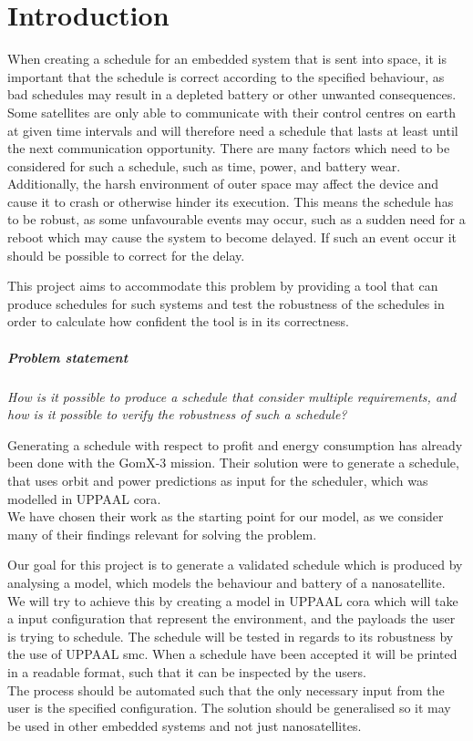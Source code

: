 \chapter{Introduction} \label{cha:intro}
When creating a schedule for an embedded system that is sent into space, it is important that the schedule is correct according to the specified behaviour, as bad schedules may result in a depleted battery or other unwanted consequences. 
Some satellites are only able to communicate with their control centres on earth at given time intervals and will therefore need a schedule that lasts at least until the next communication opportunity.
There are many factors which need to be considered for such a schedule, such as time, power, and battery wear. 
Additionally, the harsh environment of outer space may affect the device and cause it to crash or otherwise hinder its execution.
This means the schedule has to be robust, as some unfavourable events may occur, such as a sudden need for a reboot which may cause the system to become delayed. 
If such an event occur it should be possible to correct for the delay.

This project aims to accommodate this problem by providing a tool that can produce schedules for such systems and test the robustness of the schedules in order to calculate how confident the tool is in its correctness.

\paragraph{Problem statement}
\textit{How is it possible to produce a schedule that consider multiple requirements, and how is it possible to verify the robustness of such a schedule?}

Generating a schedule with respect to profit and energy consumption has already been done with the GomX-3 mission\cite{gomx3}.
Their solution were to generate a schedule, that uses orbit and power predictions as input for the scheduler, which was modelled in UPPAAL \gls{cora}.\\
We have chosen their work as the starting point for our model, as we consider many of their findings relevant for solving the problem.

Our goal for this project is to generate a validated schedule which is produced by analysing a model, which models the behaviour and battery of a nanosatellite.\\
We will try to achieve this by creating a model in UPPAAL \gls{cora} which will take a input configuration that represent the environment, and the payloads the user is trying to schedule.
The schedule will be tested in regards to its robustness by the use of UPPAAL \gls{smc}. %
When a schedule have been accepted it will be printed in a readable format, such that it can be inspected by the users.\\
The process should be automated such that the only necessary input from the user is the specified configuration.
The solution should be generalised so it may be used in other embedded systems and not just nanosatellites.
